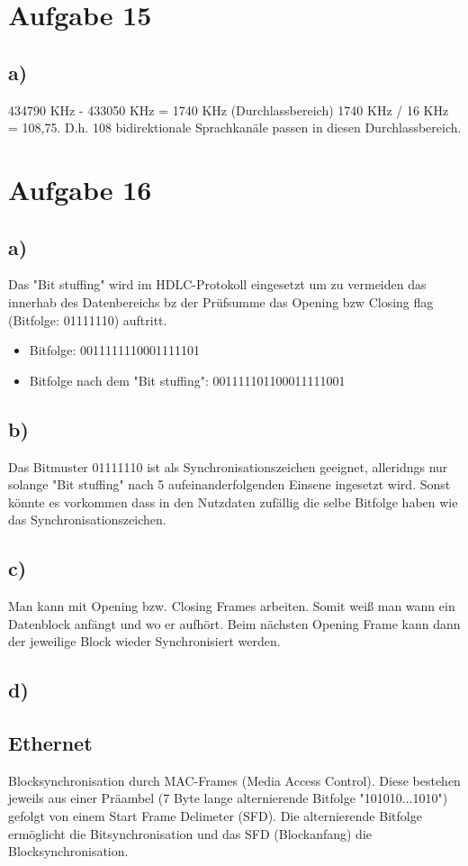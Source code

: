 \documentclass[a4paper,12pt]{scrartcl}
\begin{document}
\section{Aufgabe 15}
\subsection{a)}
434790 KHz - 433050 KHz = 1740 KHz (Durchlassbereich)
1740 KHz / 16 KHz = 108,75. D.h. 108 bidirektionale Sprachkanäle passen
in diesen Durchlassbereich.

\section{Aufgabe 16}
\subsection{a)}
Das "Bit stuffing" wird im HDLC-Protokoll eingesetzt um zu vermeiden das innerhab des Datenbereichs bz der Prüfsumme das Opening bzw Closing flag (Bitfolge: 01111110) auftritt.
\begin{itemize}
	\item Bitfolge: 0011111110001111101
	\item Bitfolge nach dem "Bit stuffing": 001111101100011111001
\end{itemize}
\subsection{b)}
Das Bitmuster 01111110 ist als Synchronisationszeichen geeignet, alleridngs nur solange "Bit stuffing" nach 5 aufeinanderfolgenden Einsene ingesetzt wird. Sonst könnte es vorkommen dass in den Nutzdaten zufällig die selbe Bitfolge haben wie das Synchronisationszeichen.
\subsection{c)}
Man kann mit Opening bzw. Closing Frames arbeiten. Somit weiß man wann ein Datenblock anfängt und wo er aufhört. Beim nächsten Opening Frame kann dann der jeweilige Block wieder Synchronisiert werden.
\subsection{d)}
\subsection{Ethernet}
Blocksynchronisation durch MAC-Frames (Media Access Control). Diese bestehen jeweils aus einer Präambel (7 Byte lange alternierende Bitfolge "101010...1010") gefolgt von einem Start Frame Delimeter (SFD). Die alternierende Bitfolge ermöglicht die Bitsynchronisation und das SFD (Blockanfang) die Blocksynchronisation.
\end{document}
